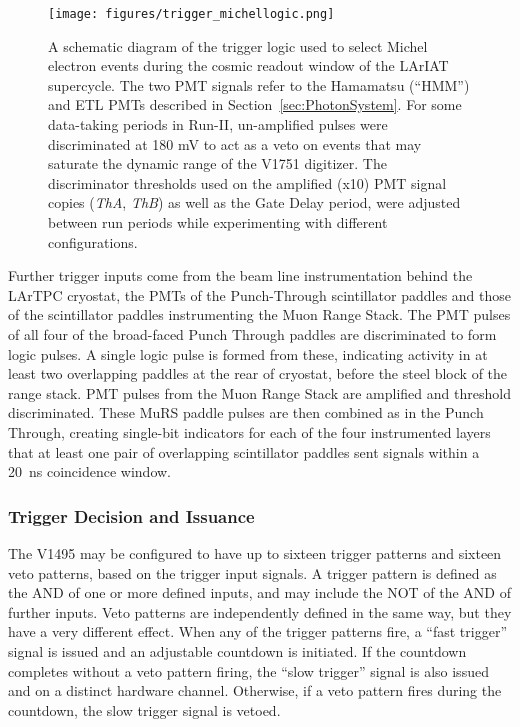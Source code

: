 \begin{figure}
\texttt{[image: figures/trigger\_michellogic.png]}
\caption{\label{michel_logic}A schematic diagram of the trigger logic used to select Michel electron events during the cosmic readout window of the LArIAT supercycle.  The two PMT signals refer to the Hamamatsu (``HMM'') and ETL PMTs described in Section~\ref{sec:PhotonSystem}.  For some data-taking periods in Run-II, un-amplified pulses were discriminated at 180 mV to act as a veto on events that may saturate the dynamic range of the V1751 digitizer.  The discriminator thresholds used on the amplified (x10) PMT signal copies (\emph{ThA}, \emph{ThB}) as well as the Gate Delay period, were adjusted between run periods while experimenting with different configurations.}
\end{figure}

Further trigger inputs come from the beam line instrumentation behind the LArTPC cryostat, the PMTs of the Punch-Through scintillator paddles and those of the scintillator paddles instrumenting the Muon Range Stack.  The PMT pulses of all four of the broad-faced Punch Through paddles are discriminated to form logic pulses.  A single logic pulse is formed from these, indicating activity in at least two overlapping paddles at the rear of cryostat, before the steel block of the range stack.  PMT pulses from the Muon Range Stack are amplified and threshold discriminated.  These MuRS paddle pulses are then combined as in the Punch Through, creating single-bit indicators for each of the four instrumented layers that at least one pair of overlapping scintillator paddles sent signals within a 20~ns coincidence window.

\subsubsection{Trigger Decision and Issuance}

The V1495 may be configured to have up to sixteen trigger patterns and sixteen veto patterns, based on the trigger input signals.  A trigger pattern is defined as the AND of one or more defined inputs, and may include the NOT of the AND of further inputs.  Veto patterns are independently defined in the same way, but they have a very different effect.  When any of the trigger patterns fire, a ``fast trigger'' signal is issued and an adjustable countdown is initiated.  If the countdown completes without a veto pattern firing, the ``slow trigger'' signal is also issued and on a distinct hardware channel. Otherwise, if a veto pattern fires during the countdown, the slow trigger signal is vetoed.  

